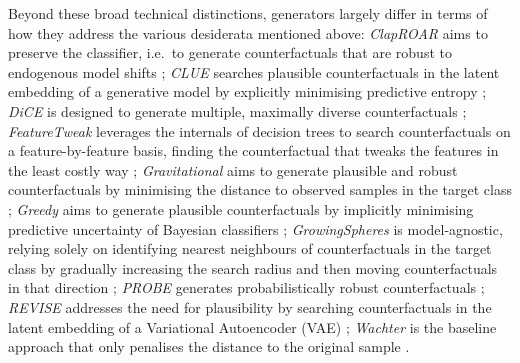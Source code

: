 \documentclass[
  letterpaper,
  DIV=11,
  numbers=noendperiod]{scrartcl}
\begin{document}
Beyond these broad technical distinctions, generators largely differ in
terms of how they address the various desiderata mentioned above:
\emph{ClapROAR} aims to preserve the classifier, i.e.~to generate
counterfactuals that are robust to endogenous model shifts
\cite{altmeyer2023endogenous}; \emph{CLUE} searches plausible
counterfactuals in the latent embedding of a generative model by
explicitly minimising predictive entropy \cite{antoran2020getting};
\emph{DiCE} is designed to generate multiple, maximally diverse
counterfactuals \cite{mothilal2020explaining}; \emph{FeatureTweak}
leverages the internals of decision trees to search counterfactuals on a
feature-by-feature basis, finding the counterfactual that tweaks the
features in the least costly way \cite{tolomei2017interpretable};
\emph{Gravitational} aims to generate plausible and robust
counterfactuals by minimising the distance to observed samples in the
target class \cite{altmeyer2023endogenous}; \emph{Greedy} aims to
generate plausible counterfactuals by implicitly minimising predictive
uncertainty of Bayesian classifiers \cite{schut2021generating};
\emph{GrowingSpheres} is model-agnostic, relying solely on identifying
nearest neighbours of counterfactuals in the target class by gradually
increasing the search radius and then moving counterfactuals in that
direction \cite{laugel2017inversea}; \emph{PROBE} generates
probabilistically robust counterfactuals
\cite{pawelczyk2022probabilistically}; \emph{REVISE} addresses the need
for plausibility by searching counterfactuals in the latent embedding of
a Variational Autoencoder (VAE) \cite{joshi2019realistic};
\emph{Wachter} is the baseline approach that only penalises the distance
to the original sample \cite{wachter2017counterfactual}.
\end{document}
